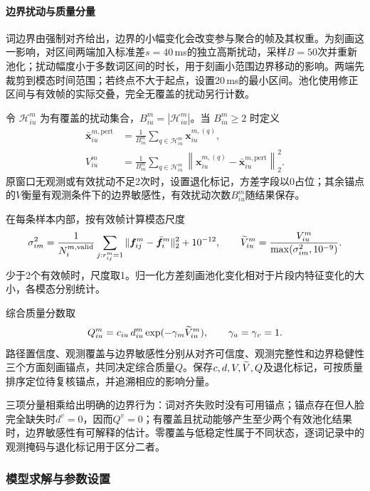 \paragraph{边界扰动与质量分量}

词边界由强制对齐给出，边界的小幅变化会改变参与聚合的帧及其权重。为刻画这一影响，对区间两端加入标准差$s=40$\,ms的独立高斯扰动，采样$B=50$次并重新池化；扰动幅度小于多数词区间的时长，用于刻画小范围边界移动的影响。两端先裁剪到模态时间范围；若终点不大于起点，设置20\,ms的最小区间。池化使用修正区间与有效帧的实际交叠，完全无覆盖的扰动另行计数。

令 $\mathcal H^m_{iu}$ 为有覆盖的扰动集合，$B^m_{iu}=|\mathcal H^m_{iu}|$。当 $B^m_{iu}\ge2$ 时定义
\begin{align}
\bar{\bm x}^{m,\mathrm{pert}}_{iu}&=\frac{1}{B^m_{iu}}\sum_{q\in\mathcal H^m_{iu}}\bm x^{m,(q)}_{iu},\\
V^m_{iu}&=\frac{1}{B^m_{iu}}\sum_{q\in\mathcal H^m_{iu}}
\left\|\bm x^{m,(q)}_{iu}-\bar{\bm x}^{m,\mathrm{pert}}_{iu}\right\|_2^2.
\label{q1:eq:variance}
\end{align}
原窗口无观测或有效扰动不足2次时，设置退化标记，方差字段以0占位；其余锚点的$V$衡量有观测条件下的边界敏感性，有效扰动次数$B^m_{iu}$随结果保存。

在每条样本内部，按有效帧计算模态尺度
\begin{equation}
\sigma_{im}^2=\frac{1}{N^{m,\mathrm{valid}}_i}\sum_{j:r^m_{ij}=1}
\|\bm f^m_{ij}-\bar{\bm f}^m_i\|_2^2+10^{-12},
\qquad \widetilde V^m_{iu}=\frac{V^m_{iu}}{\max(\sigma_{im}^2,10^{-9})}.
\label{q1:eq:scale}
\end{equation}
少于2个有效帧时，尺度取1。归一化方差刻画池化变化相对于片段内特征变化的大小，各模态分别统计。

综合质量分数取
\begin{equation}
Q^m_{iu}=c_{iu}\,d^m_{iu}\exp(-\gamma_m\widetilde V^m_{iu}),\qquad \gamma_a=\gamma_v=1.
\label{q1:eq:quality}
\end{equation}
路径置信度、观测覆盖与边界敏感性分别从对齐可信度、观测完整性和边界稳健性三个方面刻画锚点，共同决定综合质量$Q$。保存$c,d,V,\widetilde V,Q$及退化标记，可按质量排序定位待复核锚点，并追溯相应的影响分量。

三项分量相乘给出明确的边界行为：词对齐失败时没有可用锚点；锚点存在但人脸完全缺失时$d^v=0$，因而$Q^v=0$；有覆盖且扰动能够产生至少两个有效池化结果时，边界敏感性有可解释的估计。零覆盖与低稳定性属于不同状态，逐词记录中的观测掩码与退化标记用于区分二者。
\subsubsection{模型求解与参数设置}
